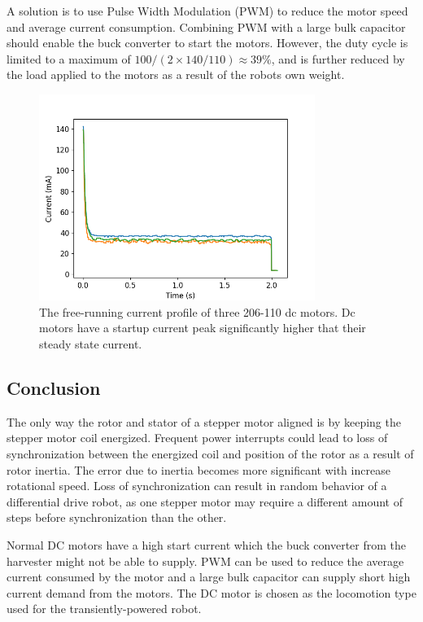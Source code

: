 A solution is to use Pulse Width Modulation (PWM) to reduce the motor speed and average current consumption.
Combining PWM with a large bulk capacitor should enable the buck converter to start the motors.
However, the duty cycle is limited to a maximum of $100/(2\times140/110) \approx 39\%$, and is further reduced by the load applied to the motors as a result of the robots own weight.

\begin{figure}%
	\centering
	\includegraphics[width=0.8\textwidth]{pics/free_running_current.png}
	\caption{The free-running current profile of three 206-110 dc motors. Dc motors have a startup current peak significantly higher that their steady state current.}
	\label{fig:free_running_current}
\end{figure}

\subsection{Conclusion}
The only way the rotor and stator of a stepper motor aligned is by keeping the stepper motor coil energized.
Frequent power interrupts could lead to loss of synchronization between the energized coil and position of the rotor as a result of rotor inertia.
The error due to inertia becomes more significant with increase rotational speed.
Loss of synchronization can result in random behavior of a differential drive robot, as one stepper motor may require a different amount of steps before synchronization than the other.

Normal DC motors have a high start current which the buck converter from the harvester might not be able to supply.
PWM can be used to reduce the average current consumed by the motor and a large bulk capacitor can supply short high current demand from the motors.
The DC motor is chosen as the locomotion type used for the transiently-powered robot.
